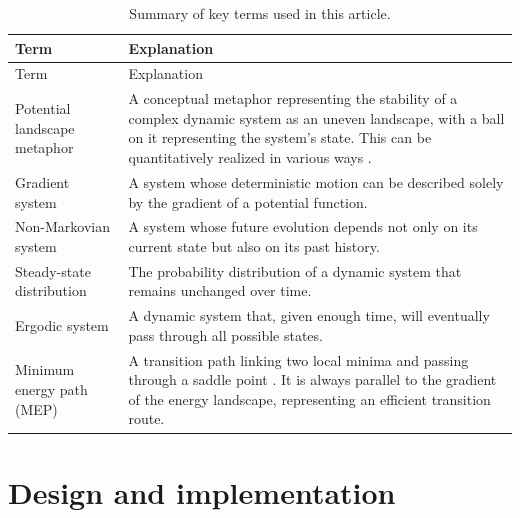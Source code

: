 \begin{longtable}[]{@{}
  >{\raggedright\arraybackslash}p{}
  >{\raggedright\arraybackslash}p{}@{}}
\caption{\label{tab:terms} Summary of key terms used in this article.}\tabularnewline
\toprule\noalign{}
\begin{minipage}[b]{\linewidth}\raggedright
Term
\end{minipage} & \begin{minipage}[b]{\linewidth}\raggedright
Explanation
\end{minipage} \\
\midrule\noalign{}
\endfirsthead
\toprule\noalign{}
\begin{minipage}[b]{\linewidth}\raggedright
Term
\end{minipage} & \begin{minipage}[b]{\linewidth}\raggedright
Explanation
\end{minipage} \\
\midrule\noalign{}
\endhead
\bottomrule\noalign{}
\endlastfoot
Potential landscape metaphor & A conceptual metaphor representing the stability of a complex dynamic system as an uneven landscape, with a ball on it representing the system's state. This can be quantitatively realized in various ways \citep{zhouConstructionLandscapeMultistable2016}. \\
Gradient system & A system whose deterministic motion can be described solely by the gradient of a potential function. \\
Non-Markovian system & A system whose future evolution depends not only on its current state but also on its past history. \\
Steady-state distribution & The probability distribution of a dynamic system that remains unchanged over time. \\
Ergodic system & A dynamic system that, given enough time, will eventually pass through all possible states. \\
Minimum energy path (MEP) & A transition path linking two local minima and passing through a saddle point \citep{WanEtAlFindingTransitionState2024}. It is always parallel to the gradient of the energy landscape, representing an efficient transition route. \\
\end{longtable}

\section{Design and implementation}\label{design-and-implementation}

